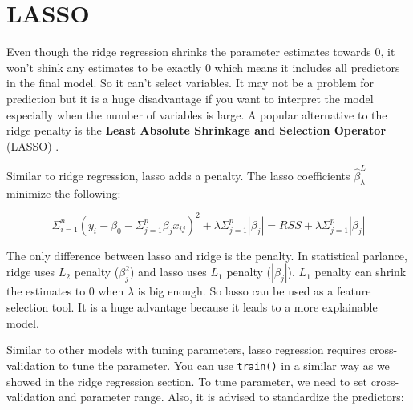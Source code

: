 \documentclass[12pt,]{krantz}
\begin{document}
\hypertarget{lasso}{%
\section{LASSO}\label{lasso}}

Even though the ridge regression shrinks the parameter estimates towards 0, it won't shink any estimates to be exactly 0 which means it includes all predictors in the final model. So it can't select variables. It may not be a problem for prediction but it is a huge disadvantage if you want to interpret the model especially when the number of variables is large. A popular alternative to the ridge penalty is the \textbf{Least Absolute Shrinkage and Selection Operator} (LASSO) \citep{Tibshirani1996}.

Similar to ridge regression, lasso adds a penalty. The lasso coefficients \(\hat{\beta}_{\lambda}^{L}\) minimize the following:

\begin{equation}
\Sigma_{i=1}^{n}(y_{i}-\beta_{0}-\Sigma_{j=1}^{p}\beta_{j}x_{ij})^{2}+\lambda\Sigma_{j=1}^{p}|\beta_{j}|=RSS+\lambda\Sigma_{j=1}^{p}|\beta_{j}|
\label{eq:lasso}
\end{equation}

The only difference between lasso and ridge is the penalty. In statistical parlance, ridge uses \(L_2\) penalty (\(\beta_{j}^{2}\)) and lasso uses \(L_1\) penalty (\(|\beta_{j}|\)). \(L_1\) penalty can shrink the estimates to 0 when \(\lambda\) is big enough. So lasso can be used as a feature selection tool. It is a huge advantage because it leads to a more explainable model.

Similar to other models with tuning parameters, lasso regression requires cross-validation to tune the parameter. You can use \texttt{train()} in a similar way as we showed in the ridge regression section. To tune parameter, we need to set cross-validation and parameter range. Also, it is advised to standardize the predictors:
\end{document}
